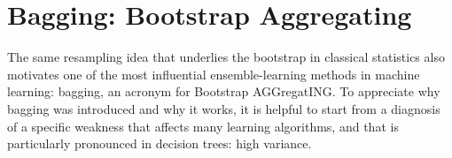 %
%

\section*{Bagging: Bootstrap Aggregating}

The same resampling idea that underlies the bootstrap in classical statistics also motivates one of the most influential ensemble-learning methods in machine learning: \alert{bagging}, an acronym for Bootstrap AGGregatING. To appreciate why bagging was introduced and why it works, it is helpful to start from a diagnosis of a specific weakness that affects many learning algorithms, and that is particularly pronounced in decision trees: \alert{high variance}.

